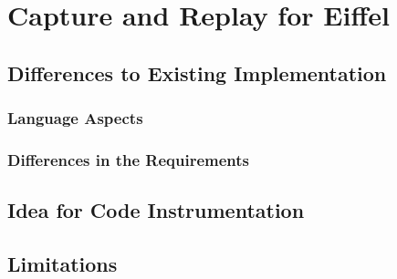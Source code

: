 \chapter{Capture and Replay for Eiffel}
\section{Differences to Existing Implementation}
\subsection{Language Aspects}

\subsection{Differences in the Requirements}





\section{Idea for Code Instrumentation}



\section {Limitations}
